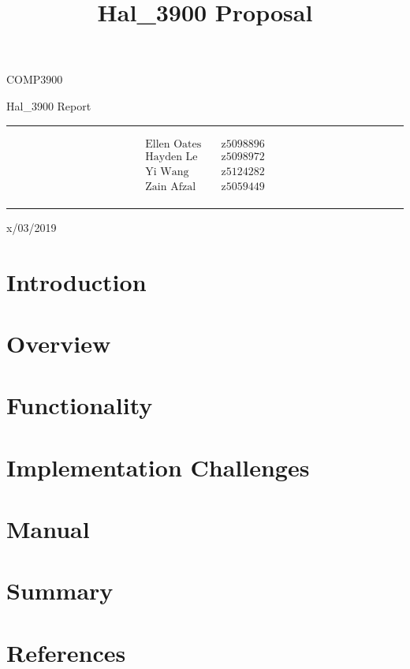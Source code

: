 \documentclass{article}
\title{Hal\_3900 Proposal}
\begin{document}
\begin{LARGE}
\begin{center}
\vspace*{15mm}

COMP3900

Hal\_3900 Report

\rule[4.5pt]{0.61\textwidth}{0.3pt}

\begin{align*}
  \text{Ellen Oates}    \quad   &\text{z5098896} \\
  \text{Hayden Le}      \quad   &\text{z5098972} \\
  \text{Yi Wang}        \quad   &\text{z5124282} \\
  \text{Zain Afzal}     \quad   &\text{z5059449} \\
\end{align*}

\rule[4.5pt]{0.61\textwidth}{0.3pt}

x/03/2019

\end{center}
\end{LARGE}
\newpage


\section{Introduction}


\section{Overview}


\section{Functionality}


\section{Implementation Challenges}


\section{Manual}


\section{Summary}


\section{References}
\end{document}
